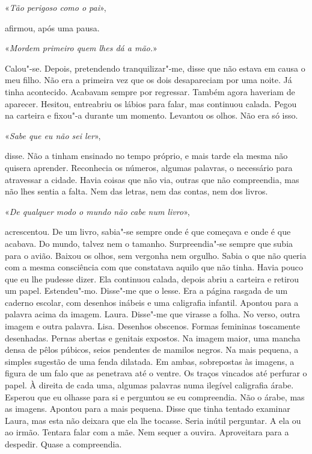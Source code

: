 «\emph{Tão perigoso como o pai}»,

afirmou, após uma pausa.

«\emph{Mordem primeiro quem lhes dá a mão.}»

Calou"-se. Depois, pretendendo tranquilizar"-me, disse que não estava em
causa o meu filho. Não era a primeira vez que os dois desapareciam por
uma noite. Já tinha acontecido. Acabavam sempre por regressar. Também
agora haveriam de aparecer. Hesitou, entreabriu os lábios para falar,
mas continuou calada. Pegou na carteira e fixou"-a durante um momento.
Levantou os olhos. Não era só isso.

«\emph{Sabe que eu não sei ler}»,

disse. Não a tinham ensinado no tempo próprio, e mais tarde ela mesma
não quisera aprender. Reconhecia os números, algumas palavras, o
necessário para atravessar a cidade. Havia coisas que não via, outras
que não compreendia, mas não lhes sentia a falta. Nem das letras, nem
das contas, nem dos livros.

«\emph{De qualquer modo o mundo não cabe num livro}»,

acrescentou. De um livro, sabia"-se sempre onde é que começava e onde é
que acabava. Do mundo, talvez nem o tamanho. Surpreendia"-se sempre que
subia para o avião. Baixou os olhos, sem vergonha nem orgulho. Sabia o
que não queria com a mesma consciência com que constatava aquilo que não
tinha. Havia pouco que eu lhe pudesse dizer. Ela continuou calada,
depois abriu a carteira e retirou um papel. Estendeu"-mo. Disse"-me que
o lesse. Era a página rasgada de um caderno escolar, com desenhos
inábeis e uma caligrafia infantil. Apontou para a palavra acima da
imagem. Laura. Disse"-me que virasse a folha. No verso, outra imagem e
outra palavra. Lisa. Desenhos obscenos. Formas femininas toscamente
desenhadas. Pernas abertas e genitais expostos. Na imagem maior, uma
mancha densa de pêlos púbicos, seios pendentes de mamilos negros. Na
mais pequena, a simples sugestão de uma fenda dilatada. Em ambas,
sobrepostas às imagens, a figura de um falo que as penetrava até o
ventre. Os traços vincados até perfurar o papel. À direita de cada uma,
algumas palavras numa ilegível caligrafia árabe. Esperou que eu olhasse
para si e perguntou se eu compreendia. Não o árabe, mas as imagens.
Apontou para a mais pequena. Disse que tinha tentado examinar Laura, mas
esta não deixara que ela lhe tocasse. Seria inútil perguntar. A ela ou
ao irmão. Tentara falar com a mãe. Nem sequer a ouvira. Aproveitara para
a despedir. Quase a compreendia.

